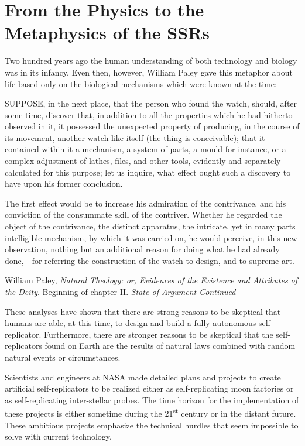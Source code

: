 \section{From the Physics to the Metaphysics of the SSRs}

Two hundred years ago the human understanding of both technology and
biology was in its infancy.  Even then, however, William Paley gave this metaphor
about life based only on the biological mechanisms which were known at the time:

\begin{quoting}
SUPPOSE, in the next place, that the person who found the
watch, should, after some time, discover that, in addition to all the
properties which he had hitherto observed in it, it possessed the
unexpected property of producing, in the course of its movement,
another watch like itself (the thing is conceivable); that it contained
within it a mechanism, a system of parts, a mould for instance, or a
complex adjustment of lathes, files, and other tools, evidently and
separately calculated for this purpose; let us inquire, what effect
ought such a discovery to have upon his former conclusion.

The first effect would be to increase his admiration of the
contrivance, and his conviction of the consummate skill of the
contriver. Whether he regarded the object of the contrivance, the
distinct apparatus, the intricate, yet in many parts intelligible
mechanism, by which it was carried on, he would perceive, in this new
observation, nothing but an additional reason for doing what he had
already done,---for referring the construction of the watch to design,
and to supreme art.

William Paley, \textit{Natural Theology: or, Evidences of the Existence
and Attributes of the Deity}. Beginning of chapter II. \textit{State of
Argument Continued}%
\end{quoting}

These analyses have shown that there are strong reasons to be skeptical that
humans are able, at this time, to design and build a fully autonomous
self-replicator. Furthermore, there are stronger reasons to be skeptical that
the self-replicators found on Earth are the results of
natural laws combined with random natural events or circumstances.

Scientists and engineers at NASA made
detailed plans and projects to create artificial self-replicators to
be realized either as self-replicating moon factories or as
self-replicating inter-stellar probes.  The time horizon for the
implementation of these projects is either sometime during the
21\textsuperscript{st} century or in the distant future. 
These ambitious projects emphasize the technical hurdles that seem impossible to solve with current technology.

